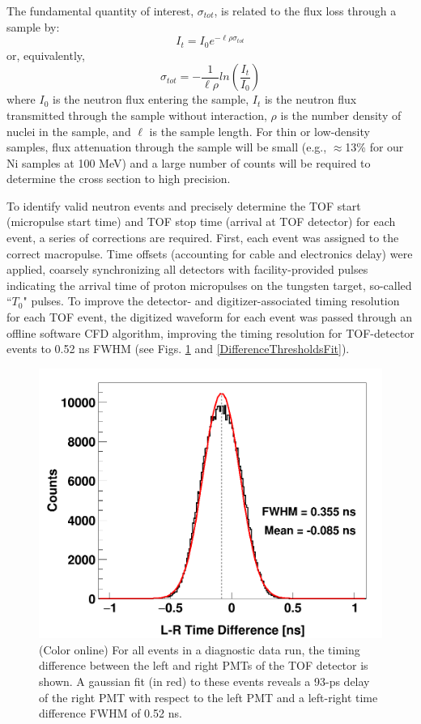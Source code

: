\documentclass[twocolumn,secnumarabic,amssymb, nobibnotes, aps, prl,
superscriptaddress, nobalancelastpage]{revtex4}
\newcommand{\tot}{\ensuremath{\sigma_{tot}}}
\begin{document}
The fundamental quantity of interest, \tot, is related to the flux
loss through a sample by:
\begin{equation}
I_{t} = I_{0}e^{-{\ell\rho\sigma_{tot}}}
\end{equation}
or, equivalently,
\begin{equation}
    \tot = -\frac{1}{\ell\rho}ln\left(\frac{I_{t}}{I_{0}}\right)
\end{equation}
where $I_{0}$ is the neutron flux entering the sample, $I_{t}$ is the neutron
flux transmitted through the sample without interaction, $\rho$ is the number
density of nuclei in the sample, and $\ell$ is the sample length. For thin
or low-density samples, flux attenuation through the sample will be small
(e.g., $\approx$13\% for our Ni samples at 100 MeV) and a large number
of counts will be required to determine the cross section to high
precision.

To identify valid neutron events and precisely determine the TOF start (micropulse start 
time) and TOF stop time (arrival at TOF detector) for each event, a series of corrections 
are required.  First, each event was assigned to the correct macropulse.
Time offsets (accounting for cable and
electronics delay) were applied, coarsely synchronizing all detectors with
facility-provided pulses indicating the arrival time of proton micropulses on the
tungsten target, so-called ``$T_{0}$" pulses.
To improve the detector- and digitizer-associated timing resolution for each TOF
event, the digitized waveform for each event was passed 
through an offline software CFD algorithm, improving the timing resolution 
for TOF-detector events to 0.52 ns FWHM (see Figs. \ref{LRTimeDifferenceLinear}
and \ref{DifferenceThresholdsFit}).

\begin{figure}
    \includegraphics[scale=0.3]{figures/Difference_Linear.png}
    \caption{(Color online) For all events in a diagnostic data run, the timing difference   
        between the left and right PMTs of the TOF detector is shown.
        A gaussian fit (in red) to these events reveals a 93-ps delay of the right PMT with 
    respect to the left PMT and a left-right time difference FWHM of 0.52 ns.}
    \label{LRTimeDifferenceLinear}
\end{figure}
\end{document}
